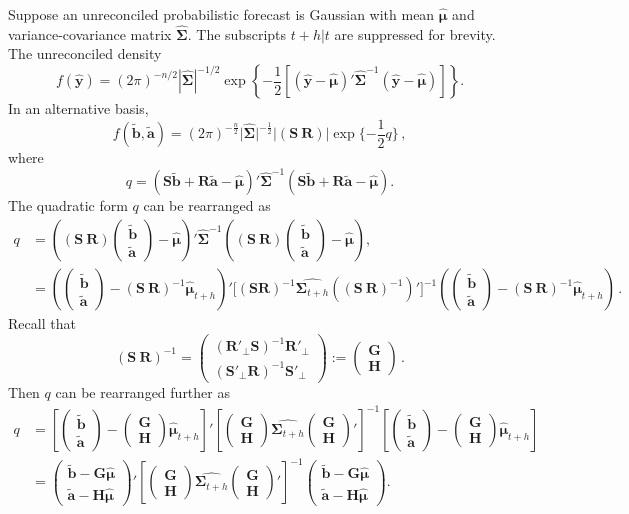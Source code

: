 \documentclass[12pt]{article}
\def\PQ{\begin{pmatrix}\bm{G}\\[-0.2cm]\bm{H}\end{pmatrix}}
\def\bt{\begin{pmatrix}\tilde{\bm{b}}\\[-0.2cm]\tilde{\bm{a}}\end{pmatrix}}
\theoremstyle{definition}
\begin{document}
Suppose an unreconciled probabilistic forecast is Gaussian with mean $\hat{\bm{\mu}}$ and variance-covariance matrix $\hat{\bm{\Sigma}}$. The subscripts $t+h|t$ are suppressed for brevity. The unreconciled density
\begin{equation}
  f(\hat{\bm{y}})=(2\pi)^{-n/2}|\hat{\bm{\Sigma}}|^{-1/2}\exp\left\{-\frac{1}{2}\left[(\hat{\bm{y}}-\hat{\bm{\mu}})'\hat{\bm{\Sigma}}^{-1}(\hat{\bm{y}}-\hat{\bm{\mu}})\right]\right\}.
\end{equation}
In an alternative basis,
\begin{equation}
f(\tilde{\bm{b}},\tilde{\bm{a}})=(2\pi)^{-\frac{n}{2}}\Big|\hat{\bm{\Sigma}}\Big|^{-\frac{1}{2}}\Big|(\bm{S} ~  \bm{R})\Big|\exp\{-\frac{1}{2}q\}\,,
\end{equation}
where
\begin{equation}
q=(\bm{S}\tilde{\bm{b}}+\bm{R}\tilde{\bm{a}}-\hat{\bm{\mu}})' \hat{\bm{\Sigma}}^{-1}(\bm{S}\tilde{\bm{b}}+\bm{R}\tilde{\bm{a}}-\hat{\bm{\mu}}).
\end{equation}
The quadratic form $q$ can be rearranged as
\begin{align*}
q& =
\left((\bm{S} ~  \bm{R})\bt-\hat{\bm{\mu}}\right)' \hat{\bm{\Sigma}}^{-1}\left((\bm{S} ~ \bm{R})\bt-\hat{\bm{\mu}}\right),\\
& =
\left(\bt-(\bm{S} ~ \bm{R})^{-1}\hat{\bm{\mu}}_{t+h}\right)' \Big[(\bm{S}  \bm{R})^{-1}\hat{\bm{\Sigma}_{t+h}}\left((\bm{S} ~ \bm{R})^{-1}\right)'\Big]^{-1}
\left(\bt-(\bm{S} ~ \bm{R})^{-1}\hat{\bm{\mu}}_{t+h}\right)\,.
\end{align*}
Recall that
\[
  (\bm{S} ~ \bm{R})^{-1} =
  \begin{pmatrix}(\bm{R}'_\bot \bm{S})^{-1}\bm{R}'_\bot  \\ (\bm{S}'_\bot \bm{R})^{-1}\bm{S}'_\bot \end{pmatrix} :=
  \begin{pmatrix}
  \bm{G} \\\bm{H}
  \end{pmatrix}\,.
\]
Then $q$ can be rearranged further as
\begin{align*}
q& =%
\left[\bt-\PQ\hat{\bm{\mu}}_{t+h}\right]'%
\left[\PQ\hat{\bm{\Sigma}_{t+h}}\PQ'\right]^{-1}\left[\bt-\PQ\hat{\bm{\mu}}_{t+h}\right] %
\\[0.5cm]
 & =%
\begin{pmatrix}\tilde{\bm{b}} - \bm{G}\hat{\bm{\mu}}\\ \tilde{\bm{a}}- \bm{H}\hat{\bm{\mu}}\end{pmatrix}' %
 \left[\PQ\hat{\bm{\Sigma}_{t+h}}\PQ'\right]^{-1}\begin{pmatrix}\tilde{\bm{b}} - \bm{G}\hat{\bm{\mu}}\\ \tilde{\bm{a}}- \bm{H}\hat{\bm{\mu}}\end{pmatrix}. %
\end{align*}
\end{document}
